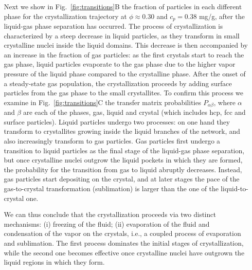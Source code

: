 \documentclass[12pt]{article}
\begin{document}
Next we show in Fig.~\ref{fig:transitions}B the fraction of particles in each different phase for the crystallization trajectory at
$\phi\approx 0.30$ and $c_p=0.38$ mg/g, after the liquid-gas phase separation has occurred. The process of crystallization is characterized 
by a steep decrease in liquid particles, as they transform in small crystalline nuclei inside the liquid domains. This decrease
is then accompanied by an increase in the fraction of gas particles: as the first crystals start to reach the gas phase, liquid particles evaporate 
to the gas phase due to the higher vapor pressure of the liquid phase compared to the crystalline phase. After the onset
of a steady-state gas population, the crystallization proceeds by adding surface particles from the gas phase to the small crystallites. To confirm this process we
examine in Fig.~\ref{fig:transitions}C the transfer matrix probabilities $P_{\alpha\beta}$, where $\alpha$ and $\beta$ are each of the 
phases, gas, liquid and crystal (which includes hcp, fcc and surface particles). Liquid particles undergo two processes: on one
hand they transform to crystallites growing inside the liquid branches of the network, and also increasingly transform to gas particles.
Gas particles first undergo a transition to liquid particles as the final stage of the liquid-gas phase separation, but once
crystalline nuclei outgrow the liquid pockets in which they are formed, the probability for the transition from gas to liquid
abruptly decreases. Instead, gas particles start depositing on the crystal, and at later stages the pace of the gas-to-crystal transformation (sublimation)
is larger than the one of the liquid-to-crystal one.

We can thus conclude that the crystallization proceeds via two distinct mechanisms:
(i) freezing of the fluid; (ii) evaporation of the fluid and condensation of the vapor on the crystals, i.e., a coupled process of evaporation and sublimation.
The first process dominates the initial stages of crystallization, while the second one becomes effective once
crystalline nuclei have outgrown the liquid regions in which they form. 
% 
\end{document}
